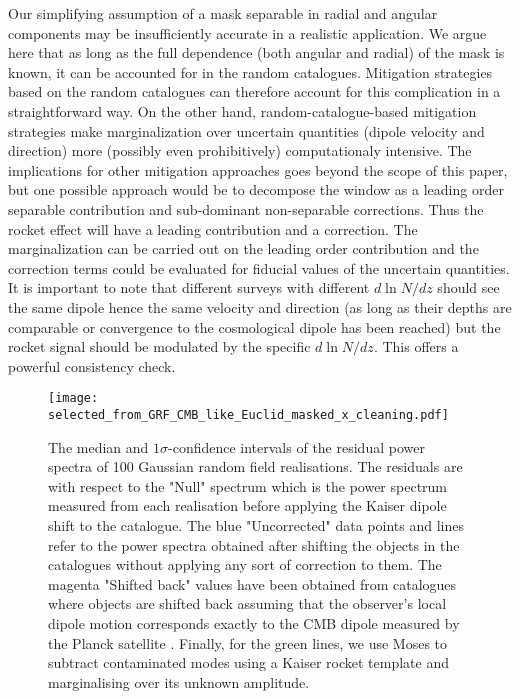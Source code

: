 \documentclass[a4paper,11pt]{article}
\begin{document}
 \label{sec:testing_mitigation}
Our simplifying assumption of a mask  separable in radial and angular components may be insufficiently accurate in a realistic application. We argue here that as long as the full dependence (both angular and radial) of the mask is known, it can be accounted for in the random catalogues. Mitigation strategies based on the random catalogues can therefore  account for  this complication in a straightforward way. On the other hand,  random-catalogue-based mitigation strategies make marginalization over uncertain quantities (dipole velocity and direction) more (possibly even prohibitively) computationaly intensive.  The implications for  other mitigation approaches goes beyond  the scope of this paper, but one possible approach would be to  decompose the  window as a leading order separable contribution and  sub-dominant non-separable corrections.  Thus the rocket effect will have a leading contribution and a correction. The marginalization can be carried out on the leading order contribution and the correction terms could be evaluated  for fiducial values of the  uncertain quantities.
It is important to note that different surveys with different $d\ln N/dz$ should see the same dipole hence the same velocity and direction (as long as their depths are comparable or convergence to the cosmological dipole has been reached) but the rocket signal should be modulated by the specific $d\ln N/dz$. This offers a powerful  consistency check.

 \begin{figure}
     \centering
     \texttt{[image: selected\_from\_GRF\_CMB\_like\_Euclid\_masked\_x\_cleaning.pdf]}
    \caption{The median and $1\sigma$-confidence intervals of the residual power spectra of 100 Gaussian random field realisations. The residuals are with respect to the "Null" spectrum which is the power spectrum measured from each realisation before applying the Kaiser dipole shift to the catalogue. The blue "Uncorrected" data points and lines refer to the power spectra obtained after shifting the objects in the catalogues without applying any sort of correction to them. The magenta "Shifted back" values have been obtained from catalogues where objects are shifted back assuming that the observer's local dipole motion corresponds exactly to the CMB dipole measured by the Planck satellite \cite{Akrami:2018vks}. Finally, for the green lines, we use Moses \cite{Kalus:2018qsy} to subtract contaminated modes using a Kaiser rocket template and marginalising over its unknown amplitude.}
     \label{fig:cleaning}
 \end{figure}
\end{document}
